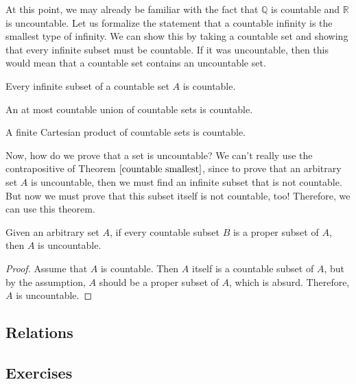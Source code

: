   At this point, we may already be familiar with the fact that $\mathbb{Q}$ is countable and $\mathbb{R}$ is uncountable. Let us formalize the statement that a countable infinity is the smallest type of infinity. We can show this by taking a countable set and showing that every infinite subset must be countable. If it was uncountable, then this would mean that a countable set contains an uncountable set. 

  \begin{theorem}
    \label{countable smallest}
    Every infinite subset of a countable set $A$ is countable. 
  \end{theorem}

  \begin{theorem}
    An at most countable union of countable sets is countable. 
  \end{theorem}

  \begin{theorem}
    A finite Cartesian product of countable sets is countable. 
  \end{theorem}

  Now, how do we prove that a set is uncountable? We can't really use the contrapositive of Theorem $\ref{countable smallest}$, since to prove that an arbitrary set $A$ is uncountable, then we must find an infinite subset that is not countable. But now we must prove that this subset itself is not countable, too! Therefore, we can use this theorem. 

  \begin{theorem}
    Given an arbitrary set $A$, if every countable subset $B$ is a proper subset of $A$, then $A$ is uncountable. 
  \end{theorem}
  \begin{proof}
    Assume that $A$ is countable. Then $A$ itself is a countable subset of $A$, but by the assumption, $A$ should be a proper subset of $A$, which is absurd. Therefore, $A$ is uncountable. 
  \end{proof}

\subsection{Relations}

\subsection{Exercises}

